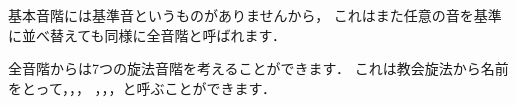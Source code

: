\documentclass[dvipdfmx,uplatex,b5paper,openany,jbase=12Q,nomag*,textwidth-limit=44%
               ]{gachimuchi}
\begin{document}
\begin{Music}[0.95\linewidth]
  \nostartrule%
  \nostartrule%
  \Startpiece%
  \Notes{}%
  \en\setemptybar%
  \endpiece%
\end{Music}

基本音階には基準音というものがありませんから，
これはまた任意の音を基準に並べ替えても同様に全音階と呼ばれます．

全音階からは7つの旋法音階を考えることができます．
これは教会旋法から名前をとって，，，
，，，と呼ぶことができます．
\end{document}

